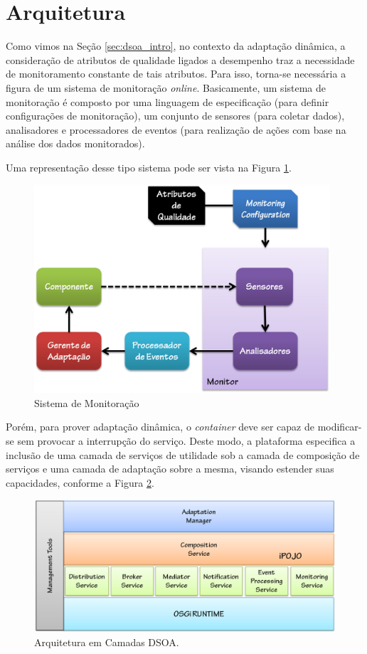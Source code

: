 \section{Arquitetura}
\label{sec:dsoa_arch}

Como vimos na Seção \ref{sec:dsoa_intro}, no contexto da adaptação dinâmica, a consideração de atributos de qualidade ligados a desempenho traz a necessidade de monitoramento constante de tais atributos. Para isso, torna-se necessária a figura de um sistema de monitoração \textit{online}. Basicamente, um sistema de monitoração é composto por uma linguagem de especificação (para definir configurações de monitoração), um conjunto de sensores (para coletar dados), analisadores e processadores de eventos (para realização de ações com base na análise dos dados monitorados). 

Uma representação desse tipo sistema pode ser vista na Figura \ref{fig:monitor}.


\begin{figure}[htp]
\centering
\includegraphics[width=11cm]{chapters/chapter3/monitor.png}
\caption{Sistema de Monitoração}
\label{fig:monitor}
\end{figure}

Porém, para prover adaptação dinâmica, o \textit{container} deve ser capaz de modificar-se sem provocar a interrupção do serviço. Deste modo, a plataforma especifica a inclusão de uma camada de serviços de utilidade sob a camada de composição de serviços e uma camada de adaptação sobre a mesma, visando estender suas capacidades, conforme a Figura \ref{fig:dsoa_arch}.

\begin{figure}[htp]
\centering
\includegraphics[width=13cm]{chapters/chapter3/dsoa-arch.png}
\caption[Arquitetura em Camadas DSOA]{Arquitetura em Camadas DSOA.}
\label{fig:dsoa_arch}
\end{figure}

